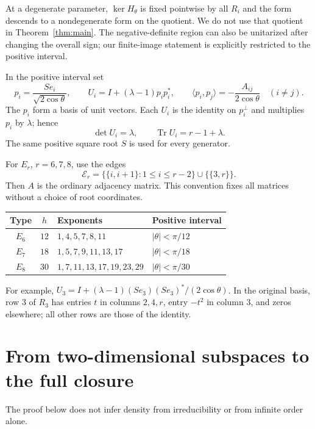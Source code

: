 \documentclass[11pt,a4paper]{article}
\theoremstyle{remark}\newtheorem{remark}[theorem]{Remark}
\newcommand{\Tr}{\operatorname{Tr}}
\begin{document}
At a degenerate parameter, $\ker H_\theta$ is fixed pointwise by all
$R_i$ and the form descends to a nondegenerate form on the quotient.
We do not use that quotient in Theorem~\ref{thm:main}.  The negative-definite
region can also be unitarized after changing the overall sign; our
finite-image statement is explicitly restricted to the positive interval.

In the positive interval set
\begin{equation}\label{eq:rankone}
 p_i=\frac{Se_i}{\sqrt{2\cos\theta}},\qquad
 U_i=I+(\lambda-1)p_ip_i^*,\qquad
 \langle p_i,p_j\rangle=-\frac{A_{ij}}{2\cos\theta}\quad(i\ne j).
\end{equation}
The $p_i$ form a basis of unit vectors.  Each $U_i$ is the identity on
$p_i^\perp$ and multiplies $p_i$ by $\lambda$; hence
\begin{equation}\label{eq:trace}
 \det U_i=\lambda,\qquad \Tr U_i=r-1+\lambda.
\end{equation}
The same positive square root $S$ is used for every generator.

For $E_r$, $r=6,7,8$, use the edges
\[
 \mathcal E_r=\{\{i,i+1\}:1\leq i\leq r-2\}\cup\{\{3,r\}\}.
\]
Then $A$ is the ordinary adjacency matrix.  This convention fixes all
matrices without a choice of root coordinates.
\begin{center}
\begin{tabular}{ccll}
\toprule
Type & $h$ & Exponents & Positive interval\\
\midrule
$E_6$ & $12$ & $1,4,5,7,8,11$ & $|\theta|<\pi/12$\\
$E_7$ & $18$ & $1,5,7,9,11,13,17$ & $|\theta|<\pi/18$\\
$E_8$ & $30$ & $1,7,11,13,17,19,23,29$ & $|\theta|<\pi/30$\\
\bottomrule
\end{tabular}
\end{center}
For example, $U_3=I+(\lambda-1)(Se_3)(Se_3)^*/(2\cos\theta)$.
In the original basis, row $3$ of $R_3$ has entries $t$ in columns
$2,4,r$, entry $-t^2$ in column $3$, and zeros elsewhere; all other
rows are those of the identity.

\section{From two-dimensional subspaces to the full closure}\label{sec:direct}
The proof below does not infer density from irreducibility or from
infinite order alone.
\end{document}
